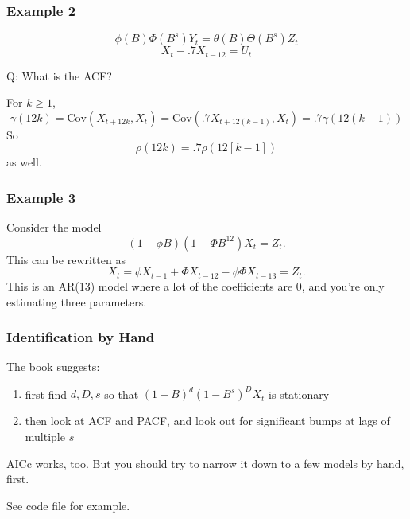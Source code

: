 \documentclass{beamer}
\begin{document}
\begin{frame}
\frametitle{Example 2}
\[
\phi(B)\Phi(B^s)Y_t = \theta(B) \Theta(B^s)Z_t
\]
\[
X_t - .7 X_{t-12} = U_t
\]

Q: What is the ACF?
\newline
\pause

For $k \ge 1$, 
\[
\gamma(12k) = \text{Cov}(X_{t+12k},X_t) = \text{Cov}(.7 X_{t+12(k-1)},X_t) = .7 \gamma(12(k-1))
\]
So 
\[
\rho(12k) = .7\rho(12[k-1])
\]
as well.

\end{frame}


\begin{frame}
\frametitle{Example 3}

Consider the model
\[
(1-\phi B)(1- \Phi B^{12})X_t = Z_t.
\]
This can be rewritten as 
\[
X_t =  \phi X_{t-1}  +\Phi X_{t-12} - \phi \Phi X_{t-13} = Z_t.
\]
This is an AR(13) model where a lot of the coefficients are $0$, and you're only estimating three parameters.

\end{frame}



\begin{frame}
\frametitle{Identification by Hand}

The book suggests:
\begin{enumerate}
\item first find $d,D,s$ so that $(1-B)^d(1-B^s)^DX_t$ is stationary
\item then look at ACF and PACF, and look out for significant bumps at lags of multiple $s$
\end{enumerate}

AICc works, too. But you should try to narrow it down to a few models by hand, first.
\newline

See code file for example.
\end{frame}
\end{document}
